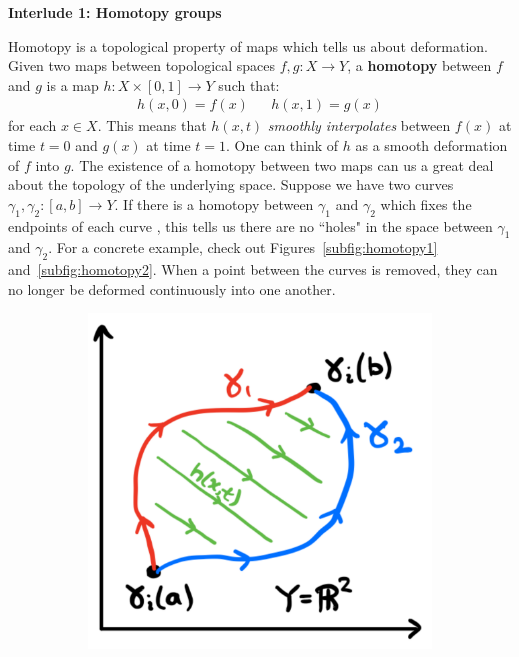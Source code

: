 \documentclass[11pt, oneside]{article}   	%
\theoremstyle{definition}
\newenvironment{answer}{\begin{center}\begin{answerbox}}{\end{answerbox}\end{center}}
\begin{document}
\begin{answer}
	\begin{center}
		\textbf{Interlude 1: Homotopy groups}
	\end{center}
	\begin{flushleft} \setlength{\parindent}{2em}
	Homotopy is a topological property of maps which tells us about deformation. Given two maps between topological spaces $f, g: X\rightarrow Y$, 
	a \textbf{homotopy} between $f$ and $g$ is a map $h : X\times [0, 1]\rightarrow Y$ such that:
	\begin{align}
		h(x, 0) = f(x) && h(x, 1) = g(x)
	\end{align}
	for each $x\in X$. This means that $h(x, t)$ \textit{smoothly interpolates} between $f(x)$ at time $t = 0$ and $g(x)$ at time $t = 1$. One can think of 
	$h$ as a smooth deformation of $f$ into $g$. The existence of a homotopy between two maps can us a great deal about the topology of the 
	underlying space. Suppose we have two curves $\gamma_1, \gamma_2 : [a, b]\rightarrow Y$. If there is a homotopy between $\gamma_1$ and 
	$\gamma_2$ which fixes the endpoints of each curve , this tells us there are no ``holes" in the space between $\gamma_1$ and $\gamma_2$. For 
	a concrete example, check out Figures~\ref{subfig:homotopy1} and~\ref{subfig:homotopy2}. When a point between the curves is removed, they can 
	no longer be deformed continuously into one another.
	\end{flushleft}
	\begin{figure}[H]
	\centering
	\begin{subfigure}[t]{.4\textwidth}
		\centering
		\includegraphics[width = .8\textwidth]{homotopy_1}

\end{subfigure}
\end{figure}
\end{answer}
\end{document}

